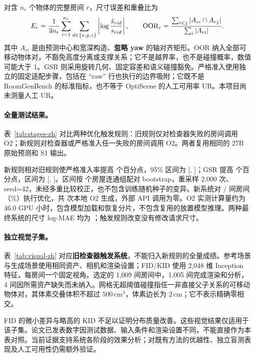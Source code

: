 对含 $n_r$ 个物体的完整房间 $r$，尺寸误差和重叠比为
\begin{equation}
 E_r=\frac{1}{3n_r}\sum_{i=1}^{n_r}\sum_{d\in\{x,y,z\}}
 \left|\log\frac{\hat{s}_{rid}}{s_{rid}}\right|,
 \qquad
 \operatorname{OOR}_r=\frac{\sum_{i<j}|A_{ri}\cap A_{rj}|}{\sum_i|A_{ri}|}.
\end{equation}
其中 $A_{ri}$ 是由预测中心和宽深构造、\textbf{忽略 yaw} 的轴对齐矩形。OOR 纳入全部可移动物体对，不豁免高度分离或支撑关系；它不是越界率，也不是碰撞概率，数值可能大于 1。GSR 则采用旋转几何、固定容差和语义碰撞豁免。严格准入使用独立的固定适配步骤，包括在 ``raw'' 行也执行的边界吸附；它既不是 RoomGenBench 的标准指标，也不等于 OptiScene 的人工可用率 UR。本项目尚未测量人工 UR。

\paragraph{全量测试结果。}
表~\ref{tab:stages-zh} 对比两种优化触发规则：旧规则仅对检查器失败的房间调用 O2；新规则对检查器或严格准入任一失败的房间调用 O2。两者复用相同的 27B 原始预测和 S1 输出。



新规则相对旧规则使严格准入率提高 \StrictGain{} 个百分点，95\% 区间为 [\StrictLo{}, \StrictHi{}]；GSR 提高 \CheckerGain{} 个百分点，区间为 [\CheckerLo{}, \CheckerHi{}]。区间按 \NumClusters{} 个房屋连通组配对 bootstrap，重采样 2,000 次、seed=42，未经多重比较校正，也不包含训练随机种子的变异。新系统对 \Escalated{}/\NumRooms{} 间房间（\EscalatedPct{}\%）执行优化，共 \OtwoRounds{} 次本地 O2 生成，外部 API 调用为零。O2 实测计算量约为 46.0 GPU 小时，包含模型加载和恢复分片，不包含复用的放置模型推理。两种最终系统的尺寸 log-MAE 均为 \SizeError{}；触发规则改变没有修改请求尺寸。

\paragraph{独立视觉子集。}
表~\ref{tab:visual-zh} 对应\textbf{旧检查器触发系统}，不能归入新规则的全量成绩。参考场景与生成场景使用相同资产、相机和渲染设置；FID/KID 使用 2,048 维 Inception 特征，每房间一个固定视角。选定的 1,009 间房间中，1,005 间完成渲染和分析，4 间因所需资产缺失而未纳入。网格无超阈值碰撞指任一非直接父子关系的可移动物体对，其体素交叠体积不超过 $500\,\mathrm{cm}^3$，体素边长为 2\,cm；它不表示精确零相交。



FID 的微小差异与略高的 KID 不足以证明分布质量改善。这些视觉结果仅适用于该子集。论文已发表数字因测试数据、输入条件和渲染设置不同，不能直接作为本表对照。当前证据支持系统各阶段的效果分析；对既有方法的优越性、独立盲测表现及人工可用性仍需额外验证。
